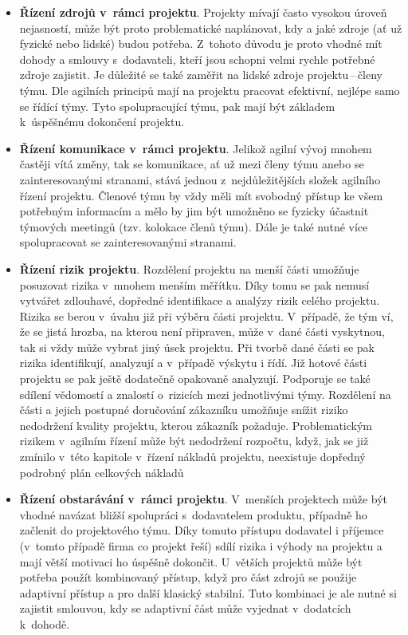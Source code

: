 \begin{itemize}
    \item \textbf{Řízení zdrojů v~rámci projektu}. Projekty mívají často vysokou úroveň nejasností, může být proto problematické naplánovat, kdy a jaké zdroje (ať už fyzické nebo lidské) budou potřeba. Z~tohoto důvodu je proto vhodné mít dohody a smlouvy s~dodavateli, kteří jsou schopni velmi rychle potřebné zdroje zajistit. Je důležité se také zaměřit na lidské zdroje projektu\,--\,členy týmu. Dle agilních principů mají na projektu pracovat efektivní, nejlépe samo se řídící týmy. Tyto spolupracující týmu, pak mají být základem k~úspěšnému dokončení projektu.
    \item \textbf{Řízení komunikace v~rámci projektu}. Jelikož agilní vývoj mnohem častěji vítá změny, tak se komunikace, ať už mezi členy týmu anebo se zainteresovanými stranami, stává jednou z~nejdůležitějších složek agilního řízení projektu. Členové týmu by vždy měli mít svobodný přístup ke všem potřebným informacím a mělo by jim být umožněno se fyzicky účastnit týmových meetingů (tzv. kolokace členů týmu). Dále je také nutné více spolupracovat se zainteresovanými stranami.  
    \item \textbf{Řízení rizik projektu}. Rozdělení projektu na menší části umožňuje posuzovat rizika v~mnohem menším měřítku. Díky tomu se pak nemusí vytvářet zdlouhavé, dopředné identifikace a analýzy rizik celého projektu. Rizika se berou v~úvahu již při výběru části projektu. V~případě, že tým ví, že se jistá hrozba, na kterou není připraven, může v~dané části vyskytnou, tak si vždy může vybrat jiný úsek projektu. Při tvorbě dané části se pak rizika identifikují, analyzují a v~případě výskytu i řídí. Již hotové části projektu se pak ještě dodatečně opakovaně analyzují. Podporuje se také sdílení vědomostí a znalostí o~rizicích mezi jednotlivými týmy. Rozdělení na části a jejich postupné doručování zákazníku umožňuje snížit riziko nedodržení kvality projektu, kterou zákazník požaduje. Problematickým rizikem v~agilním řízení může být nedodržení rozpočtu, když, jak se již zmínilo v~této kapitole v~řízení nákladů projektu, neexistuje dopředný podrobný plán celkových nákladů
    \item \textbf{Řízení obstarávání v~rámci projektu}. V~menších projektech může být vhodné navázat bližší spolupráci s~dodavatelem produktu, případně ho začlenit do projektového týmu. Díky tomuto přístupu dodavatel i příjemce (v~tomto případě firma co projekt řeší) sdílí rizika i výhody na projektu a mají větší motivaci ho úspěšně dokončit. U~větších projektů může být potřeba použít kombinovaný přístup, když pro část zdrojů se použije adaptivní přístup a pro další klasický stabilní. Tuto kombinaci je ale nutné si zajistit smlouvou, kdy se adaptivní část může vyjednat v~dodatcích k~dohodě.

\end{itemize}
